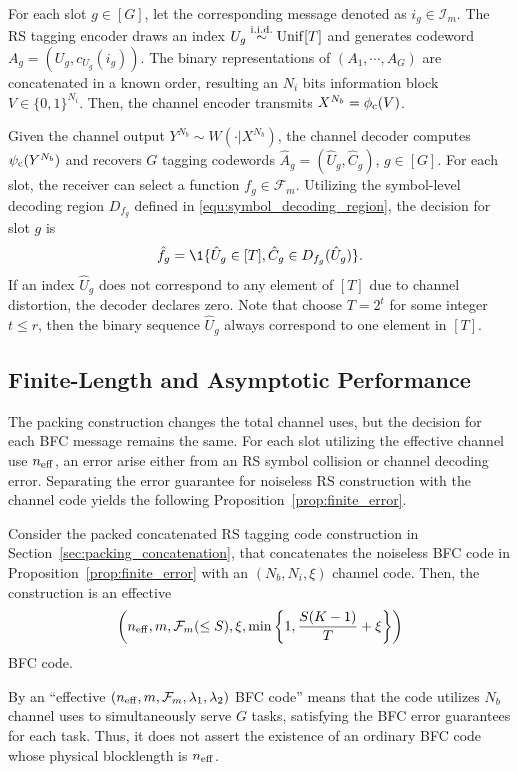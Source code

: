 For each slot $g\in[G]$, let the corresponding message denoted as $i_g\in\mathcal{I}_m$. The RS tagging encoder draws an index $U_g\overset{\rm i.i.d.}{\sim}{\rm Unif}[T]$ and generates codeword $A_g=(U_g,c_{U_g}(i_g))$. The binary representations of $(A_1,\cdots,A_G)$ are concatenated in a known order, resulting an $N_i$ bits information block $V\in\{0,1\}^{N_i}$. Then, the channel encoder transmits $X^{N_b}=\phi_{\rm c}(V)$.

Given the channel output $Y^{N_b}\sim W(\cdot|X^{N_b})$, the channel decoder computes $\psi_{\rm c}(Y^{N_b})$ and recovers $G$ tagging codewords $\hat A_g=(\hat U_g,\hat C_g)$, $g\in[G]$. For each slot, the receiver can select a function $f_g\in\mathcal{F}_m$. Utilizing the symbol-level decoding region $D_{f_g}$ defined in \eqref{equ:symbol_decoding_region}, the decision for slot $g$ is
\begin{equation}
    \hat f_g=\1\{\hat U_g\in[T], \hat C_g\in D_{f_g}(\hat U_g)\}.
\end{equation}
If an index $\hat U_g$ does not correspond to any element of $[T]$ due to channel distortion, the decoder declares zero. Note that choose $T = 2^t$ for some integer $t\leq r$, then the binary sequence $\hat U_g$ always correspond to one element in $[T]$.

\subsection{Finite-Length and Asymptotic Performance}
The packing construction changes the total channel uses, but the decision for each BFC message remains the same. For each slot utilizing the effective channel use $n_{\rm eff}$, an error arise either from an RS symbol collision or channel decoding error. Separating the error guarantee for noiseless RS construction with the channel code yields the following Proposition~\ref{prop:finite_error}.
\begin{proposition}
    \label{prop:noisy_finite_error}
    Consider the packed concatenated RS tagging code construction in Section~\ref{sec:packing_concatenation}, that concatenates the noiseless BFC code in Proposition~\ref{prop:finite_error} with an $(N_b,N_i,\xi)$ channel code. Then, the construction is an effective
    \begin{equation}
        \left(n_{\rm eff},m,\mathcal{F}_m(\leq S),\xi,\min\left\{1,\frac{S(K-1)}{T}+\xi\right\}\right)
    \end{equation}
    BFC code.
\end{proposition}
By an ``effective $(n_{\rm eff},m,\mathcal{F}_m,\lambda_1,\lambda_2)$ BFC code'' means that the code utilizes $N_b$ channel uses to simultaneously serve $G$ tasks, satisfying the BFC error guarantees for each task. Thus, it does not assert the existence of an ordinary BFC code whose physical blocklength is $n_{\rm eff}$.



